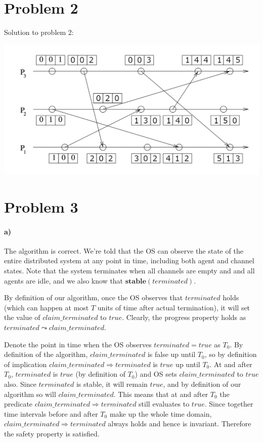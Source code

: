 \documentclass[10pt,letter]{article}
\begin{document}
\pagebreak

\section*{Problem 2}

Solution to problem 2:

\includegraphics[width=\textwidth,height=\textheight,keepaspectratio]{hw4_problem2}

\section*{Problem 3}

\paragraph{a)} The algorithm is correct. We're told that the OS can observe the state of the entire distributed system at any point in time, including both agent and channel states. Note that the system terminates when all channels are empty and and all agents are idle, and we also know that $\textbf{stable}(terminated)$.

By definition of our algorithm, once the OS observes that $terminated$ holds (which can happen at most $T$ units of time after actual termination), it will set the value of $claim\_terminated$ to $true$. Clearly, the progress property holds as $terminated \leadsto claim\_terminated$.

Denote the point in time when the OS observes $terminated = true$ as $T_0$. By definition of the algorithm, $claim\_terminated$ is false up until $T_0$, so by definition of implication $claim\_terminated \Rightarrow terminated$ is $true$ up until $T_0$. At and after $T_0$, $terminated$ is $true$ (by definition of $T_0$) and OS sets $claim\_terminated$ to $true$ also. Since $terminated$ is stable, it will remain $true$, and by definition of our algorithm so will $claim\_terminated$. This means that at and after $T_0$ the predicate $claim\_terminated \Rightarrow terminated$ still evaluates to $true$. Since together time intervals before and after $T_0$ make up the whole time domain, $claim\_terminated \Rightarrow terminated$ always holds and hence is invariant. Therefore the safety property is satisfied.
\end{document}
